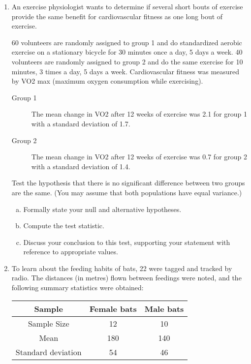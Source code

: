 \documentclass[a4paper,12pt]{article}
\begin{document}
\begin{enumerate}
\item
An exercise physiologist wants to determine if several short bouts of exercise provide the same benefit for cardiovascular fitness as one long bout of exercise. 

60 volunteers are randomly assigned to group 1 and do standardized aerobic exercise on a stationary bicycle for 30 minutes once a day, 5 days a week. 40 volunteers are randomly assigned to group 2 and do the same exercise for 10 minutes, 3 times a day, 5 days a week. Cardiovascular fitness was measured by VO2 max (maximum oxygen consumption while exercising). 

\begin{description}
	\item[Group 1] The mean change in VO2 after 12 weeks of exercise was 2.1 for group 1 with a standard deviation of 1.7.
	\item[Group 2] The mean change in VO2 after 12 weeks of exercise was 0.7 for group 2 with a standard deviation of 1.4. 
\end{description}

\noindent Test the hypothesis that there is no significant difference between two groups are the same. (You may assume that both populations have equal variance.)

\begin{enumerate}[(a)]
	\item Formally state your null and alternative hypotheses.
	\item Compute the test statistic.
	\item Discuss your conclusion to this test, supporting your statement with reference to appropriate values.
\end{enumerate}

\item To learn about the feeding habits of bats, 22 were tagged and tracked by
radio. The distances (in metres) flown between feedings were noted, and the
following summary statistics were obtained:


\begin{center}
\begin{tabular}{|c|c|c|} \hline 
Sample & Female bats & Male bats \\ \hline
Sample Size & 12 & 10 \\ \hline
Mean & 180 & 140 \\ \hline
Standard deviation & 54 & 46 \\ \hline
\end{tabular}
\end{center}


\end{enumerate}
\end{document}
